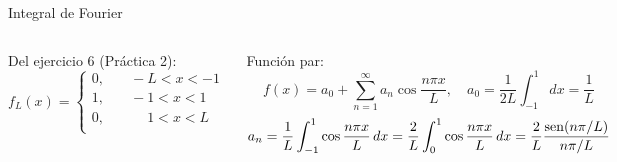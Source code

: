 \documentclass[9pt, aspectratio=169]{beamer}
\begin{document}
\begin{frame}{Integral de Fourier}
\begin{columns}[t]
Del ejercicio 6 (Práctica 2):
\begin{equation*}
f_L(x) =
\begin{cases}
    0,& \quad -L < x < -1 \\
    1,& \quad -1 < x < 1 \\
    0,& \quad \phantom{-}1 < x < L \\
\end{cases}
\end{equation*}
\pause

Función par:
\[ f(x) = a_0 + \sum_{n = 1}^{\infty} a_n \cos \frac{n \pi x}{L}, \quad a_0 = \frac{1}{2L} \int_{-1}^{1} dx = \frac{1}{L} \]
\[ a_n = \frac{1}{L} \int_{-1}^{1} \cos\frac{n \pi x}{L} \, dx = \frac{2}{L} \int_{0}^{1} \cos\frac{n \pi x}{L} \, dx = \frac{2}{L} \frac{\operatorname{sen}(n \pi / L)}{n \pi / L} \]
\end{columns}
\pause


\end{frame}
\end{document}

